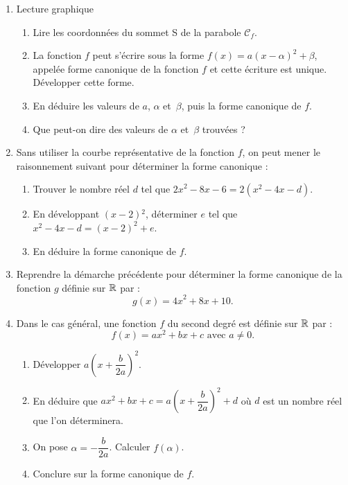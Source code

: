 \documentclass[a4paper,11pt]{article}
\begin{document}
  \begin{enumerate}
  \item Lecture graphique
    \begin{enumerate}
    \item Lire les coordonnées du sommet S de la parabole $\mathcal{C}_f$.

    \item La fonction $f$ peut s'écrire sous la
      forme $f\left(x\right)=a{\left(x-\alpha{}\right)}^2+\beta{}$,
      appelée forme canonique de la fonction $f$ et cette écriture est
      unique. Développer cette forme.  

    \item En déduire les valeurs de $a$, $\alpha{}$ et~$\beta{}$, puis la forme canonique de $f$.
    
    \item Que peut-on dire des valeurs de  $\alpha{}$ et~$\beta{}$ trouvées ?
    \end{enumerate}

  \item Sans utiliser la courbe représentative de la fonction $f$, on
    peut mener le raisonnement suivant pour déterminer la forme
    canonique :
    \begin{enumerate}
    \item Trouver le nombre réel $d$ tel que
      ${2x}^2-8x-6=2\left(x^2-4x-d\right)$.

    \item En développant $(x - 2){^2}$, déterminer $e$ tel que
      $x^2-4x-d={\left(x-2\right)}^2+e$.

    \item En déduire la forme canonique de $f$.
    \end{enumerate}

  \item Reprendre la démarche précédente pour déterminer la forme
    canonique de la fonction $g$ définie sur $\mathbb{R}$ par :
    \[g\left(x\right)={4x}^2+8x+10.\]

\newpage

  \item Dans le cas g\'{e}n\'{e}ral, une fonction $f$ du second
    degr\'{e} est d\'{e}finie sur $\mathbb{R}$ par :
    \[f\left(x\right)={ax}^2+bx+c \text{ avec } a\neq 0.\]
\begin{enumerate}
\item D\'{e}velopper $a{\left(x+\dfrac{b}{2a}\right)}^2$.

\item En d\'{e}duire que
  ${ax}^2+bx+c=a{\left(x+\dfrac{b}{2a}\right)}^2+d$ o\`{u} $d$ est un
  nombre r\'{e}el que l'on d\'{e}terminera.

\item On pose $\alpha{}=-\dfrac{b}{2a}$. Calculer
  $f\left(\alpha{}\right)$.

\item Conclure sur la forme canonique de $f$.
\end{enumerate}
  \end{enumerate}
\end{document}
